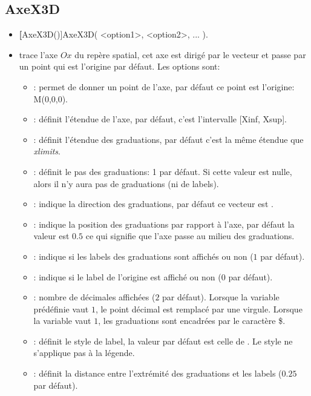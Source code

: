 \subsection{AxeX3D}
\begin{itemize}
 \item \util \textbf[AxeX3D()]{AxeX3D( <option1>, <option2>, ... )}.
 \item \desc trace l'axe $Ox$ du repère spatial, cet axe est dirigé par le vecteur  et passe par un point qui est l'origine par défaut. Les options sont:

  \begin{itemize}
  \item {}: permet de donner un point de l'axe, par défaut ce point est l'origine: M(0,0,0).
  \item {}: définit l'étendue de l'axe, par défaut, c'est l'intervalle [Xinf, Xsup].
  \item \opt{xgradlimits}{[x1,x2}: définit l'étendue des graduations, par défaut c'est la même étendue que
\textit{xlimits}.
  \item {}: définit le pas des graduations: 1 par défaut. Si cette valeur est nulle, alors il n'y aura pas de graduations (ni de labels).
  \item {}: indique la direction des graduations, par défaut ce vecteur est .
  \item {}: indique la position des graduations par rapport à l'axe, par défaut la valeur est $0.5$ ce qui signifie que l'axe passe au milieu des graduations.
  \item {}: indique si les labels des graduations sont affichés ou non ($1$ par défaut).
  \item {}: indique si le label de l'origine est affiché ou non ($0$ par défaut).
  \item {}: nombre de décimales affichées ($2$ par défaut). Lorsque la variable prédéfinie  vaut $1$, le point décimal est remplacé par une virgule. Lorsque la variable  vaut $1$, les graduations sont encadrées par le caractère \$.
  \item {}: définit le style de label, la valeur par défaut est celle de . Le style ne s'applique pas à la légende. 
  \item {}: définit la distance entre l'extrémité des graduations et les labels ($0.25$ par défaut).

\end{itemize}
\end{itemize}

